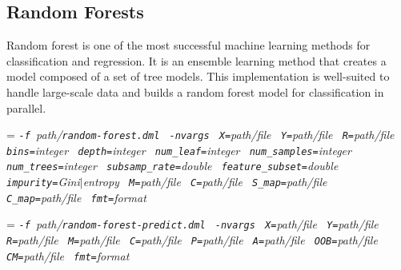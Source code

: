 \begin{comment}

 Licensed to the Apache Software Foundation (ASF) under one
 or more contributor license agreements.  See the NOTICE file
 distributed with this work for additional information
 regarding copyright ownership.  The ASF licenses this file
 to you under the Apache License, Version 2.0 (the
 "License"); you may not use this file except in compliance
 with the License.  You may obtain a copy of the License at

   http://www.apache.org/licenses/LICENSE-2.0

 Unless required by applicable law or agreed to in writing,
 software distributed under the License is distributed on an
 "AS IS" BASIS, WITHOUT WARRANTIES OR CONDITIONS OF ANY
 KIND, either express or implied.  See the License for the
 specific language governing permissions and limitations
 under the License.

\end{comment}

\subsection{Random Forests}
\label{random_forests}

\smallskip


Random forest is one of the most successful machine learning methods for classification and regression. 
It is an ensemble learning method that creates a model composed of a set of tree models.
This implementation is well-suited to handle large-scale data and builds a random forest model for classification in parallel.\\


\smallskip
{}
\smallskip

{\hangindent=\parindent\noindent\it%
	{\tt{}-f }path/\/{\tt{}random-forest.dml}
	{\tt{} -nvargs}
	{\tt{} X=}path/file
	{\tt{} Y=}path/file
	{\tt{} R=}path/file
	{\tt{} bins=}integer
	{\tt{} depth=}integer
	{\tt{} num\_leaf=}integer
	{\tt{} num\_samples=}integer
	{\tt{} num\_trees=}integer
	{\tt{} subsamp\_rate=}double
	{\tt{} feature\_subset=}double
	{\tt{} impurity=}Gini$\mid$entropy
	{\tt{} M=}path/file
	{\tt{} C=}path/file
	{\tt{} S\_map=}path/file
	{\tt{} C\_map=}path/file
	{\tt{} fmt=}format
	
}

 \smallskip
 \smallskip
 
 {\hangindent=\parindent\noindent\it%
 	{\tt{}-f }path/\/{\tt{}random-forest-predict.dml}
 	{\tt{} -nvargs}
 	{\tt{} X=}path/file
 	{\tt{} Y=}path/file
 	{\tt{} R=}path/file
 	{\tt{} M=}path/file
 	{\tt{} C=}path/file
 	{\tt{} P=}path/file
 	{\tt{} A=}path/file
 	{\tt{} OOB=}path/file
 	{\tt{} CM=}path/file
 	{\tt{} fmt=}format
 	
 }\smallskip
 
